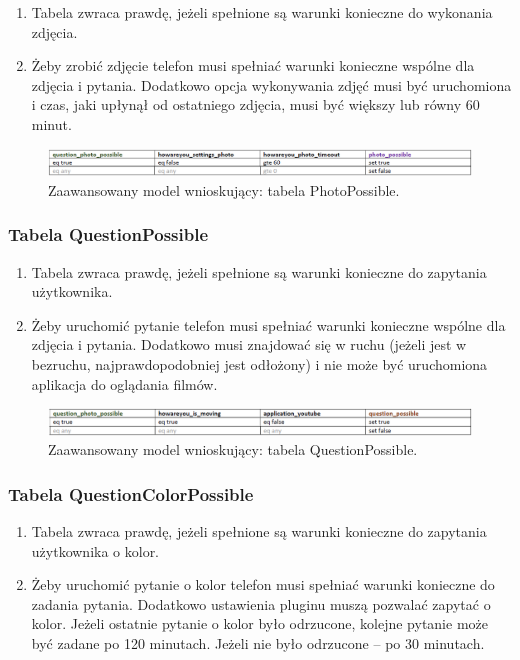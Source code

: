 \begin{enumerate}
\item Tabela zwraca prawdę, jeżeli spełnione są warunki konieczne do wykonania zdjęcia.
\item Żeby zrobić zdjęcie telefon musi spełniać warunki konieczne wspólne dla zdjęcia i pytania. Dodatkowo opcja wykonywania zdjęć musi być uruchomiona i czas, jaki upłynął od ostatniego zdjęcia, musi być większy lub równy 60 minut.

\end{enumerate}

\begin{figure}[H]
\centering
\includegraphics[scale=0.8]{rozdzial4/HMR_PhotoPossible.png}
\caption{Zaawansowany model wnioskujący: tabela PhotoPossible.}
\end{figure}


\subsubsection{Tabela QuestionPossible}

\begin{enumerate}
\item Tabela zwraca prawdę, jeżeli spełnione są warunki konieczne do zapytania użytkownika.
\item Żeby uruchomić pytanie telefon musi spełniać warunki konieczne wspólne dla zdjęcia i pytania. Dodatkowo musi znajdować się w ruchu (jeżeli jest w bezruchu, najprawdopodobniej jest odłożony) i nie może być uruchomiona aplikacja do oglądania filmów. 
\end{enumerate}

\begin{figure}[H]
\centering
\includegraphics[scale=0.8]{rozdzial4/HMR_QuestionPossible.png}
\caption{Zaawansowany model wnioskujący: tabela QuestionPossible.}
\end{figure}


\subsubsection{Tabela QuestionColorPossible}

\begin{enumerate}
\item Tabela zwraca prawdę, jeżeli spełnione są warunki konieczne do zapytania użytkownika o kolor.
\item Żeby uruchomić pytanie o kolor telefon musi spełniać warunki konieczne do zadania pytania. Dodatkowo ustawienia pluginu muszą pozwalać zapytać o kolor. Jeżeli ostatnie pytanie o kolor było odrzucone, kolejne pytanie może być zadane po 120 minutach. Jeżeli nie było odrzucone – po 30 minutach.


\end{enumerate}

